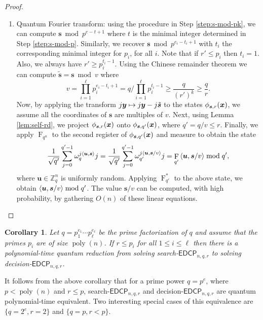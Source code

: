 \documentclass[11pt]{article}
\theoremstyle{plain}
\newtheorem{corollary}[theorem]{Corollary}
\theoremstyle{definition}
\DeclareMathOperator{\poly}{poly}
\DeclareMathOperator{\qft}{F}
\let\ket\relax
\DeclarePairedDelimiter{\ket}{\lvert}{\rangle}
\DeclarePairedDelimiter{\lrang}{\langle}{\rangle}
\def\Z{\mathbb{Z}}
\def\edcp{\mathsf{EDCP}}
\begin{document}
\begin{proof}
\begin{enumerate}[leftmargin = *, font = \bfseries]
    \item Quantum Fourier transform: using the procedure in Step \ref{step:s-mod-pk}, we can compute $\bm{s} \bmod p^{e - t + 1}$ where $t$ is  the minimal integer determined in Step \ref{step:s-mod-p}. Similarly, we recover $\bm{s} \bmod p^{e_i - t_i + 1}$ with $t_i$ the corresponding minimal integer for $p_i$, for all $i$. Note that if $r' \le p_i$ then $t_i = 1$. Also, we always have $r' \ge p_i^{t_i - 1}$. Using the Chinese remainder theorem we can compute $\tilde{\bm{s}} = \bm{s} \bmod v$ where
    \[ v = \prod_{i = 1}^\ell p_i^{e_i - t_i + 1} = q / \prod_{i = 1}^\ell p_i^{t_i - 1} \ge \frac{q}{(r')^k} \ge \frac{q}{r}. \]
    Now, by applying the transform $\ket{j}\ket{\bm{y}} \mapsto \ket{j}\ket{\bm{y} - j\tilde{\bm{s}}}$ to the states $\ket{\phi_{\bm{s}, r}(\bm{x})}$, we assume all the coordinates of $\bm{s}$ are multiples of $v$. Next, using Lemma \ref{lem:self-rd}, we project $\ket{\phi_{\bm{s}, r}(\bm{x})}$ onto $\ket{\phi_{\bm{s}, q'}(\bm{x})}$, where $q' = q / v \le r$. Finally, we apply $\qft_{q^n}$ to the second register of $\ket{\phi_{\bm{s}, q'}(\bm{x})}$ and measure to obtain the state
    \[ \frac{1}{\sqrt{q'}} \sum_{j = 0}^{q' - 1} \omega_q^{j\lrang{\bm{u}, \bm{s}}} \ket{j} = \frac{1}{\sqrt{q'}} \sum_{j = 0}^{q' - 1} \omega_{q'}^{j\lrang{\bm{u}, \bm{s} / v}} \ket{j} = \qft_{q'}\ket{\lrang{\bm{u}, \bm{s} / v} \bmod q'}, \]
    where $\bm{u} \in \Z_q^n$ is uniformly random. Applying $\qft_{q'}^*$ to the above state, we obtain $\lrang{\bm{u}, \bm{s} / v} \bmod q'$. The value $\bm{s} / v$ can be computed, with high probability, by gathering $O(n)$ of these linear equations. \qedhere
    \end{enumerate}
\end{proof}

\begin{corollary}
    Let $q = p_1^{e_1} \cdots p_\ell^{e_\ell}$ be the prime factorization of $q$ and assume that the primes $p_i$ are of size $\poly(n)$. If $r \le p_i$ for all $1 \le i \le \ell$ then there is a polynomial-time quantum reduction from solving search-$\edcp_{n, q, r}$ to solving decision-$\edcp_{n, q, r}$. 
\end{corollary}

It follows from the above corollary that for a prime power $q = p^e$, where $p < \poly(n)$ and $r \le p$, search-$\edcp_{n, q, r}$ and decision-$\edcp_{n, q, r}$ are quantum polynomial-time equivalent. Two interesting special cases of this equivalence are $\{q = 2^e, r = 2\}$ and $\{q = p, r < p\}$.
\end{document}
